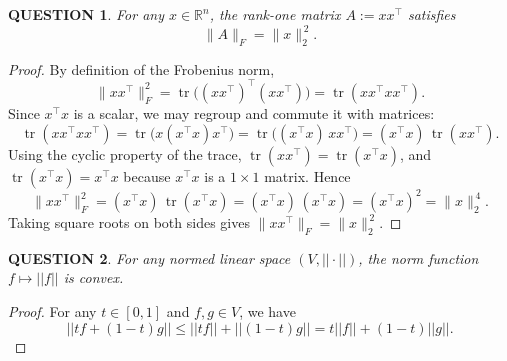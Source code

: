 \documentclass[12pt]{article}
\renewcommand{\(}{\left(}%
\renewcommand{\)}{\right)}%
\renewcommand{\[}{\left[}%
\renewcommand{\]}{\right]}%
\newtheorem{question}{QUESTION}[section]}
\newtheorem{proof}{Proof.}}
\begin{document}
\begin{question}
	For any $x\in\mathbb{R}^n$, the rank-one matrix $A:=xx^\top$ satisfies
\begin{equation*}
	\|A\|_{F}=\|x\|_2^{\,2}.
\end{equation*}
\end{question}

\begin{proof}
By definition of the Frobenius norm,
\begin{equation*}
\|xx^\top\|_{F}^{2}
=\operatorname{tr}\!\big((xx^\top)^\top(xx^\top)\big)
=\operatorname{tr}(xx^\top xx^\top).
\end{equation*}
Since $x^\top x$ is a scalar, we may regroup and commute it with matrices:
\begin{equation*}
\operatorname{tr}(xx^\top xx^\top)
=\operatorname{tr}\!\big(x(x^\top x)x^\top\big)
=\operatorname{tr}\!\big((x^\top x)\,xx^\top\big)
=(x^\top x)\,\operatorname{tr}(xx^\top).
\end{equation*}
Using the cyclic property of the trace, $\operatorname{tr}(xx^\top)=\operatorname{tr}(x^\top x)$, and
$\operatorname{tr}(x^\top x)=x^\top x$ because $x^\top x$ is a $1\times 1$ matrix. Hence
\begin{equation*}
\|xx^\top\|_{F}^{2}
=(x^\top x)\,\operatorname{tr}(x^\top x)
=(x^\top x)\,(x^\top x)
=(x^\top x)^2
=\|x\|_2^{\,4}.
\end{equation*}
Taking square roots on both sides gives $\|xx^\top\|_{F}=\|x\|_2^{\,2}$.
\end{proof}

\begin{question}
	For any normed linear space $(V,||\cdot||)$, the norm function $f\mapsto ||f||$ is convex. 
\end{question}
\begin{proof}
	For any $t\in [0,1]$ and $f,g\in V$, we have
	\begin{equation*}
		||tf+(1-t)g||\leq ||tf||+||(1-t)g||=t||f||+(1-t)||g||.
	\end{equation*}
\end{proof}
\end{document}
